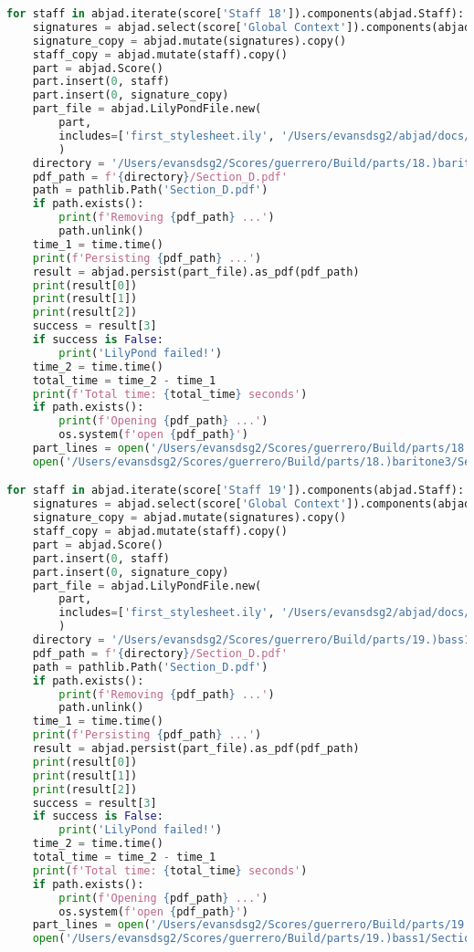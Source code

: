 \begin{lstlisting}[language=Python, caption=Invocation Source Code]
for staff in abjad.iterate(score['Staff 18']).components(abjad.Staff):
    signatures = abjad.select(score['Global Context']).components(abjad.Staff)
    signature_copy = abjad.mutate(signatures).copy()
    staff_copy = abjad.mutate(staff).copy()
    part = abjad.Score()
    part.insert(0, staff)
    part.insert(0, signature_copy)
    part_file = abjad.LilyPondFile.new(
        part,
        includes=['first_stylesheet.ily', '/Users/evansdsg2/abjad/docs/source/_stylesheets/abjad.ily'],
        )
    directory = '/Users/evansdsg2/Scores/guerrero/Build/parts/18.)baritone3'
    pdf_path = f'{directory}/Section_D.pdf'
    path = pathlib.Path('Section_D.pdf')
    if path.exists():
        print(f'Removing {pdf_path} ...')
        path.unlink()
    time_1 = time.time()
    print(f'Persisting {pdf_path} ...')
    result = abjad.persist(part_file).as_pdf(pdf_path)
    print(result[0])
    print(result[1])
    print(result[2])
    success = result[3]
    if success is False:
        print('LilyPond failed!')
    time_2 = time.time()
    total_time = time_2 - time_1
    print(f'Total time: {total_time} seconds')
    if path.exists():
        print(f'Opening {pdf_path} ...')
        os.system(f'open {pdf_path}')
    part_lines = open('/Users/evansdsg2/Scores/guerrero/Build/parts/18.)baritone3/Section_D.ly').readlines()
    open('/Users/evansdsg2/Scores/guerrero/Build/parts/18.)baritone3/Section_D.ly', 'w').writelines(part_lines[15:-1])

for staff in abjad.iterate(score['Staff 19']).components(abjad.Staff):
    signatures = abjad.select(score['Global Context']).components(abjad.Staff)
    signature_copy = abjad.mutate(signatures).copy()
    staff_copy = abjad.mutate(staff).copy()
    part = abjad.Score()
    part.insert(0, staff)
    part.insert(0, signature_copy)
    part_file = abjad.LilyPondFile.new(
        part,
        includes=['first_stylesheet.ily', '/Users/evansdsg2/abjad/docs/source/_stylesheets/abjad.ily'],
        )
    directory = '/Users/evansdsg2/Scores/guerrero/Build/parts/19.)bass1'
    pdf_path = f'{directory}/Section_D.pdf'
    path = pathlib.Path('Section_D.pdf')
    if path.exists():
        print(f'Removing {pdf_path} ...')
        path.unlink()
    time_1 = time.time()
    print(f'Persisting {pdf_path} ...')
    result = abjad.persist(part_file).as_pdf(pdf_path)
    print(result[0])
    print(result[1])
    print(result[2])
    success = result[3]
    if success is False:
        print('LilyPond failed!')
    time_2 = time.time()
    total_time = time_2 - time_1
    print(f'Total time: {total_time} seconds')
    if path.exists():
        print(f'Opening {pdf_path} ...')
        os.system(f'open {pdf_path}')
    part_lines = open('/Users/evansdsg2/Scores/guerrero/Build/parts/19.)bass1/Section_D.ly').readlines()
    open('/Users/evansdsg2/Scores/guerrero/Build/parts/19.)bass1/Section_D.ly', 'w').writelines(part_lines[15:-1])


\end{lstlisting}
